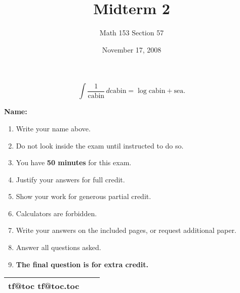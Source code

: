 \documentclass[12pt]{article}
\title{Midterm 2}
\author{Math 153 Section 57}
\date{November 17, 2008}
\makeatletter
\def\inputtoc{%
    \makeatletter
    \@input{\jobname.toc}%
    \if@filesw
      \expandafter\newwrite\csname tf@toc\endcsname
      \immediate\openout \csname tf@toc\endcsname \jobname.toc\relax
    \fi
    \@nobreakfalse
    }
\makeatother
\begin{document}
\setlength{\headheight}{30pt}


\begin{titlepage}
\maketitle

\begin{center}
$$
\int \frac{1}{\mbox{cabin}} \, d\mbox{cabin} = \log \mbox{cabin} + \mbox{sea}.
$$
\end{center}
\vfill
\vfill

\noindent
\hspace{1in}
\textbf{Name: } \hrulefill
\hspace{1in}

\vfill

\begin{multicols}{2}
\begin{enumerate}
\item Write your name above.
\item Do not look inside the exam until instructed to do so.
\item You have \textbf{50 minutes} for this exam.
\item Justify your answers for full credit.
\item Show your work for generous partial credit.
\item Calculators are forbidden.
\item Write your answers on the included pages, or request additional paper.
\item Answer all questions asked.
\item \textbf{The final question is for extra credit.}
\vfill
\end{enumerate}

\begin{center}
\large
\begin{tabular}{|lrl|}
\hline
\inputtoc
\\ \hline
\end{tabular}
\end{center}

\end{multicols}

\vfill
\vfill
\end{titlepage}
\end{document}

